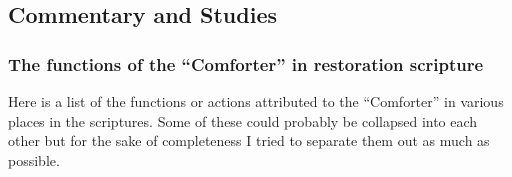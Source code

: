 		
	
	
	
	
\subsection{Commentary and Studies} %
	\label{COMFORTER-COMMENTARY}

	
		
	\subsubsection{The functions of the ``Comforter'' in restoration scripture}
		\label{COMFORTER-functions}
		
		Here is a list of the functions or actions attributed to the ``Comforter'' in various places in the scriptures. Some of these could probably be collapsed into each other but for the sake of completeness I tried to separate them out as much as possible.
		

